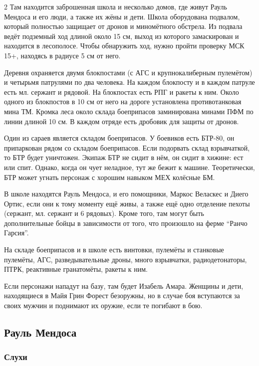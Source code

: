 \documentclass[twoside]{article}
\begin{document}
\begin{multicols}{2}
Там находится заброшенная школа и несколько домов, где живут Рауль
Мендоса и его люди, а также их жёны и дети. Школа оборудована подвалом,
который полностью защищает от дронов и миномётного обстрела. Из подвала
ведёт подземный ход длиной около 15 см, выход из которого замаскирован и
находится в лесополосе. Чтобы обнаружить ход, нужно пройти проверку МСК
15+, находясь в радиусе 5 см от него.

Деревня охраняется двумя блокпостами (с АГС и крупнокалиберным
пулемётом) и четырьмя патрулями по два человека. На каждом блокпосту и в
каждом патруле есть мл. сержант и рядовой. На блокпостах есть РПГ и
ракеты к ним. Около одного из блокпостов в 10 см от него на дороге
установлена противотанковая мина ТМ. Кромка леса около склада
боеприпасов заминирована минами ПФМ по линии длиной 10 см. В каждом
отряде есть дробовик для защиты от дронов.

Один из сараев является складом боеприпасов. У боевиков есть БТР-80, он
припаркован рядом со складом боеприпасов. Если подорвать склад
взрывчаткой, то БТР будет уничтожен. Экипаж БТР не сидит в нём, он сидит
в хижине: ест или спит. Однако, когда он чует неладное, тут же бежит к
машине. Теоретически, БТР может угнать персонаж с хорошим навыком МЕХ
колёсные БМ.

В школе находятся Рауль Мендоса, и его помощники, Маркос Веласкес и
Диего Ортис, если они к тому моменту ещё живы, а также ещё одно
отделение пехоты (сержант, мл. сержант и 6 рядовых). Кроме того, там
могут быть дополнительные бойцы в зависимости от того, что произошло на
ферме \enquote{Ранчо Гарсия}.

На складе боеприпасов и в школе есть винтовки, пулемёты и станковые
пулемёты, АГС, разведывательные дроны, много взрывчатки,
радиодетонаторы, ПТРК, реактивные гранатомёты, ракеты к ним.

Если персонажи нападут на базу, там будет Изабель Амара. Женщины и дети,
находящиеся в Майя Грин Форест безоружны, но в случае боя вступаются за
своих мужчин и поднимают их оружие, если те погибают в бою.

\subsection{Рауль Мендоса}\label{raul-mendoza}

\subsubsection{Слухи}\label{rumors-mendoza}


\end{multicols}
\end{document}
